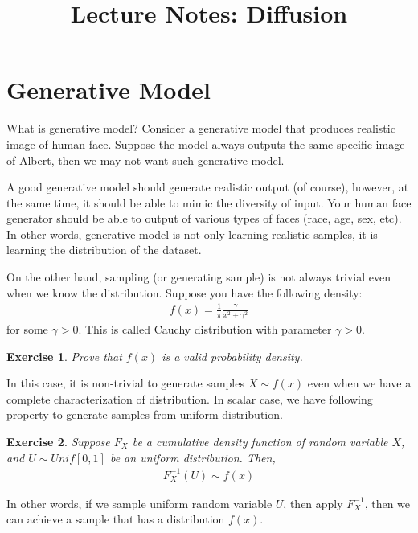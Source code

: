 \documentclass[11pt]{article}
\newtheorem{exercise}{Exercise}
\begin{document}
\title{Lecture Notes: Diffusion}
\author{}
\date{}
\maketitle


\section{Generative Model} \label{sec:diffusion-generative}
What is generative model?
Consider a generative model that produces realistic image of human face.
Suppose the model always outputs the same specific image of Albert, 
then we may not want such generative model.

A good generative model should generate realistic output (of course),
however, at the same time, it should be able to mimic the diversity of input.
Your human face generator should be able to output of various types of faces (race, age, sex, etc).
In other words, generative model is not only learning realistic samples, 
it is learning the distribution of the dataset.

On the other hand, sampling (or generating sample) is not always trivial even when we know the distribution.
Suppose you have the following density:
\begin{align}
    f(x) = \frac{1}{\pi} \frac{\gamma}{x^2+\gamma^2}
\end{align}
for some $\gamma>0$.
This is called Cauchy distribution with parameter $\gamma>0$.

\begin{exercise}
    Prove that $f(x)$ is a valid probability density.
\end{exercise}

In this case, it is non-trivial to generate samples $X\sim f(x)$ even when we have a complete characterization of distribution.
In scalar case, we have following property to generate samples from uniform distribution.
\begin{exercise}
    Suppose $F_X$ be a cumulative density function of random variable $X$, and $U\sim Unif[0, 1]$ be an uniform distribution.
    Then,
    \begin{align}
        F_X^{-1}(U) \sim f(x)
    \end{align}
\end{exercise}
In other words, if we sample uniform random variable $U$, then apply $F^{-1}_X$, then we can achieve a sample that has a distribution $f(x)$.
\end{document}
